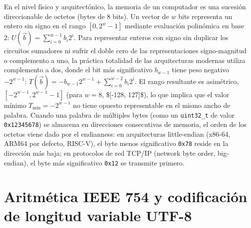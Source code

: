 \documentclass{book}
\begin{document}
En el nivel físico y arquitectónico, la memoria de un computador es una sucesión direccionable de octetos (bytes de 8 bits). Un vector de \(w\) bits representa un entero sin signo en el rango \([0, 2^w - 1]\) mediante evaluación polinómica en base 2: \(U(\vec{b}) = \sum_{i=0}^{w-1} b_i 2^i\). Para representar enteros con signo sin duplicar los circuitos sumadores ni sufrir el doble cero de las representaciones signo-magnitud o complemento a uno, la práctica totalidad de las arquitecturas modernas utiliza complemento a dos, donde el bit más significativo \(b_{w-1}\) tiene peso negativo \(-2^{w-1}\): \(T(\vec{b}) = -b_{w-1} 2^{w-1} + \sum_{i=0}^{w-2} b_i 2^i\). El rango resultante es asimétrico, \([-2^{w-1}, 2^{w-1} - 1]\) (para \(w = 8\), \$[-128, 127]\$), lo que implica que el valor mínimo \(T_{\min} = -2^{w-1}\) no tiene opuesto representable en el mismo ancho de palabra.
Cuando una palabra de múltiples bytes (como un \texttt{uint32\_t} de valor \texttt{0x12345678}) se almacena en direcciones consecutivas de memoria, el orden de los octetos viene dado por el endianness: en arquitecturas little-endian (x86-64, ARM64 por defecto, RISC-V), el byte menos significativo \texttt{0x78} reside en la dirección más baja; en protocolos de red TCP/IP (network byte order, big-endian), el byte más significativo \texttt{0x12} se transmite primero.

\section{Aritmética IEEE 754 y codificación de longitud variable UTF-8}
\end{document}
